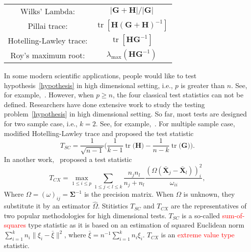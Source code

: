 \documentclass[12pt]{article} %
\DeclareMathOperator{\mytr}{tr}
\newcommand{\bX}{\mathbf{X}}
\newcommand{\bH}{\mathbf{H}}
\newcommand{\bG}{\mathbf{G}}
\newcommand{\bfsym}[1]{\ensuremath{\boldsymbol{#1}}}
\def\bSigma {\bfsym {\Sigma}}
\theoremstyle{definition}
\begin{document}
       \begin{center}
       \begin{tabular}{|cc|}
           \hline
       {Wilks' Lambda:} & $|\bG+\bH|/|\bG|$\\
       {Pillai trace:} & $\mytr[\bH(\bG+\bH)^{-1}]$\\
       {Hotelling-Lawley trace:} & $\mytr[\bH \bG^{-1}]$\\
       {Roy's maximum root:} & $\lambda_{\max}(\bH \bG^{-1})$\\
           \hline
           \end{tabular}
       \end{center}



In some modern scientific applications, people would like to test hypothesis~\eqref{hypothesis} in high dimensional setting, i.e., $p$ is greater than $n$.
See, for example,~\cite{Tsai2009}.
However, when $p\geq n$, the four classical test statistics can not be defined.
  Researchers have done extensive work to study the testing problem~\eqref{hypothesis} in high dimensional setting.
 So far, most tests are designed for two sample case, i.e., $k=2$.
  See, for example,~\citet{Bai1996Efiect,Chen2010A,Srivastava2009A,Tony2013,Feng2015Multivariate}.
  For multiple sample case,~\cite{Schott2007Some} modified Hotelling-Lawley trace and proposed the test statistic
  $$
  T_{SC}=\frac{1}{\sqrt{n-1}}\Big(
  \frac{1}{k-1}\mytr\big(\bH\big)-\frac{1}{n-k}\mytr\big(\bG\big)
  \Big).
  $$
In another work,~\cite{Cai2014High} proposed a test statistic
  $$
  T_{CX}=\max_{1\leq i\leq p} \sum_{1\leq j<l\leq k}\frac{n_j n_l}{n_j+n_l}\frac{(\Omega(\bar{\bX}_j-\bar{\bX}_l))_i^2}{\omega_{ii}},
  $$
  Where $\Omega=(\omega)_{ij}=\bSigma^{-1}$ is the precision matrix. When $\Omega$ is unknown, they substitute it by an estimator $\hat{\Omega}$.
  Stitistics $T_{SC}$ and $T_{CX}$ are the representatives of two popular methodologies for high dimensional tests.
  $T_{SC}$ is a so-called \textcolor{red}{sum-of-squares} type statistic as it is based on an estimation of squared Euclidean norm $\sum_{i=1}^k n_i\|\xi_i-\bar{\xi}\|^2$, where $\bar{\xi}=n^{-1}\sum_{i=1}^k n_i \xi_i$.
  $T_{CX}$ is an \textcolor{red}{extreme value type} statistic.
  
\end{document}
